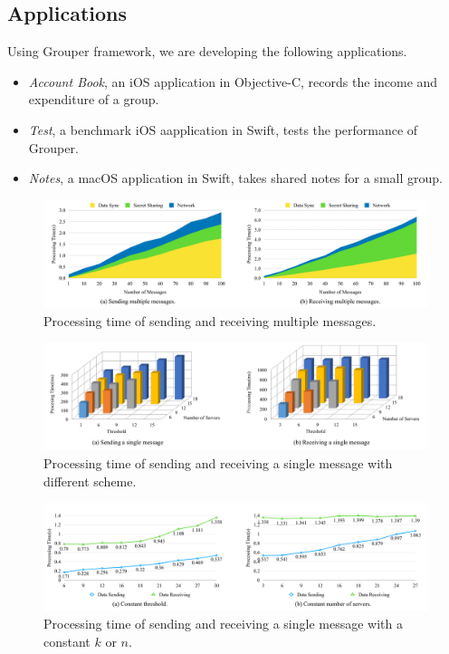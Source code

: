 \documentclass[twocolumn,10pt]{article}
\begin{document}
\subsection{Applications}

Using Grouper framework, we are developing the following applications. 

\begin{itemize}
	\setlength{\itemsep}{1pt}
	\setlength{\parskip}{0pt}
	\setlength{\parsep}{0pt}
	\item \emph{Account Book}, an iOS application in Objective-C, records the income and expenditure of a group.
	\item \emph{Test}, a benchmark iOS aapplication in Swift, tests the performance of Grouper.
	\item \emph{Notes}, a macOS application in Swift, takes shared notes for a small group.
\end{itemize}

\begin{figure}[t]
	\centering
	\includegraphics[scale=0.13]{multiple_messages}
	\caption{Processing time of sending and receiving multiple messages.}
\end{figure}

\begin{figure}[t]
	\centering
	\includegraphics[scale=0.35]{3d}
	\caption{Processing time of sending and receiving a single message with different scheme.}
\end{figure}

\begin{figure}[t]
	\centering
	\includegraphics[scale=0.13]{constant_k_n}
	\caption{Processing time of sending and receiving a single message with a constant ${k}$ or ${n}$.}
\end{figure}
\end{document}
